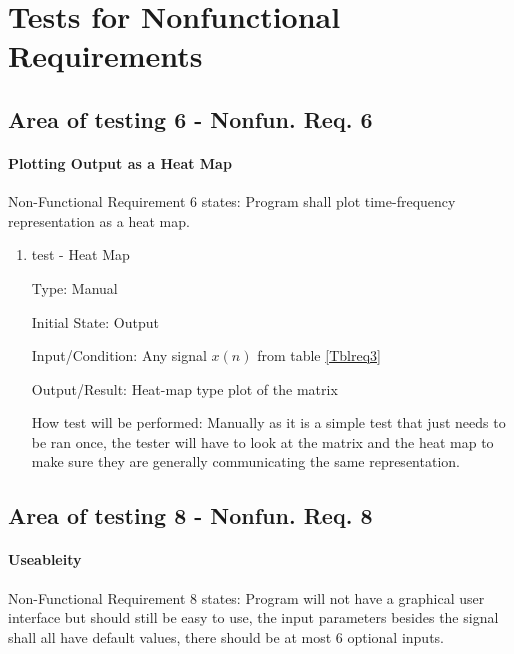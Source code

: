 \documentclass[12pt, titlepage]{article}
\begin{document}
\section{Tests for Nonfunctional Requirements}


\subsection{Area of testing 6 - Nonfun. Req. 6} \label{test_heatmap}
\paragraph{Plotting Output as a Heat Map}

Non-Functional Requirement 6 states: Program shall plot time-frequency representation as a heat map.

\begin{enumerate}

\item{test - Heat Map\\}

Type: Manual
					
Initial State: Output 
					
Input/Condition: Any signal $x(n)$ from table \ref{Tblreq3}
					
Output/Result: Heat-map type plot of the matrix
					
How test will be performed: Manually as it is a simple test that just needs to be ran once, the tester will have to look at the matrix and the heat map to make sure they are generally communicating the same representation. 
					
\end{enumerate}


\subsection{Area of testing 8 - Nonfun. Req. 8} \label{test_usability}
\paragraph{Useableity}

Non-Functional Requirement 8 states: Program will not have a graphical user interface but should still be easy to use, the input parameters besides the signal shall all have default values, there should be at most 6 optional inputs.
\end{document}

